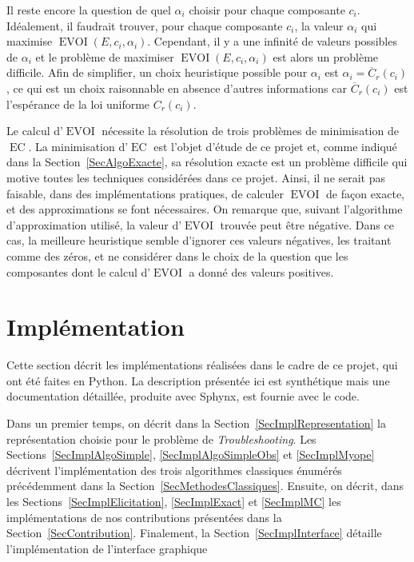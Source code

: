 \documentclass[a4paper,11pt]{article}
\theoremstyle{plain}
\theoremstyle{definition}
\DeclareMathOperator{\EC}{EC}
\DeclareMathOperator{\EVOI}{EVOI}
\begin{document}
Il reste encore la question de quel $\alpha_i$ choisir pour chaque composante $c_i$. Idéalement, il faudrait trouver, pour chaque composante $c_i$, la valeur $\alpha_i$ qui maximise $\EVOI(E, c_i, \alpha_i)$. Cependant, il y a une infinité de valeurs possibles de $\alpha_i$ et le problème de maximiser $\EVOI(E, c_i, \alpha_i)$ est alors un problème difficile. Afin de simplifier, un choix heuristique possible pour $\alpha_i$ est $\alpha_i = \overline C_r(c_i)$, ce qui est un choix raisonnable en absence d'autres informations car $\overline C_r(c_i)$ est l'espérance de la loi uniforme $C_r(c_i)$.

Le calcul d'$\EVOI$ nécessite la résolution de trois problèmes de minimisation de $\EC$. La minimisation d'$\EC$ est l'objet d'étude de ce projet et, comme indiqué dans la Section~\ref{SecAlgoExacte}, sa résolution exacte est un problème difficile qui motive toutes les techniques considérées dans ce projet. Ainsi, il ne serait pas faisable, dans des implémentations pratiques, de calculer $\EVOI$ de façon exacte, et des approximations se font nécessaires. On remarque que, suivant l'algorithme d'approximation utilisé, la valeur d'$\EVOI$ trouvée peut être négative. Dans ce cas, la meilleure heuristique semble d'ignorer ces valeurs négatives, les traitant comme des zéros, et ne considérer dans le choix de la question que les composantes dont le calcul d'$\EVOI$ a donné des valeurs positives.

\section{Implémentation}
\label{SecImplementation}

Cette section décrit les implémentations réalisées dans le cadre de ce projet, qui ont été faites en Python. La description présentée ici est synthétique mais une documentation détaillée, produite avec Sphynx, est fournie avec le code.

Dans un premier temps, on décrit dans la Section~\ref{SecImplRepresentation} la représentation choisie pour le problème de \emph{Troubleshooting}. Les Sections~\ref{SecImplAlgoSimple}, \ref{SecImplAlgoSimpleObs} et \ref{SecImplMyope} décrivent l'implémentation des trois algorithmes classiques énumérés précédemment dans la Section~\ref{SecMethodesClassiques}. Ensuite, on décrit, dans les Sections~\ref{SecImplElicitation}, \ref{SecImplExact} et \ref{SecImplMC} les implémentations de nos contributions présentées dans la Section~\ref{SecContribution}. Finalement, la Section~\ref{SecImplInterface} détaille l'implémentation de l'interface graphique
\end{document}
